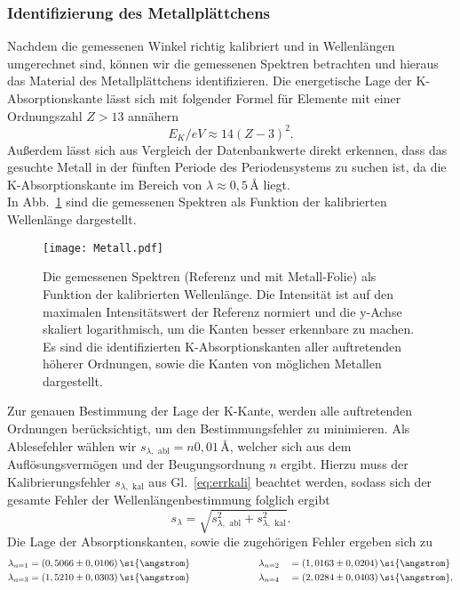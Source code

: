 \subsubsection{Identifizierung des Metallplättchens}
Nachdem die gemessenen Winkel richtig kalibriert und in Wellenlängen umgerechnet sind, können wir die 
gemessenen Spektren betrachten und hieraus das Material des Metallplättchens identifizieren. 
Die energetische Lage der K-Absorptionskante lässt sich mit folgender Formel für Elemente mit 
einer Ordnungszahl $Z>13$ annähern \cite{Kener}
\begin{equation}
    E_{K}/\si{eV} \approx 14\left(Z-3\right)^{2}.
\end{equation}
Außerdem lässt sich aus Vergleich der Datenbankwerte \cite{Database} direkt erkennen, dass 
das gesuchte Metall in der fünften Periode des Periodensystems zu suchen ist, da die K-Absorptionskante 
im Bereich von $\lambda\approx 0,5\,\si{\angstrom}$ liegt. \\
In Abb.~\ref{fig:metallspekt} sind die gemessenen Spektren als Funktion der kalibrierten 
Wellenlänge dargestellt.
\begin{figure}[h!]
    \centering
    \texttt{[image: Metall.pdf]}
    \caption{\label{fig:metallspekt}Die gemessenen Spektren (Referenz und mit Metall-Folie)
    als Funktion der kalibrierten Wellenlänge. Die Intensität ist auf den maximalen Intensitätswert der 
    Referenz normiert und die y-Achse skaliert logarithmisch, um die Kanten besser erkennbare zu machen.
    Es sind die identifizierten K-Absorptionskanten aller auftretenden höherer Ordnungen, sowie die 
    Kanten von möglichen Metallen dargestellt.}
\end{figure}\FloatBarrier
Zur genauen Bestimmung der Lage der K-Kante, werden alle auftretenden 
Ordnungen berücksichtigt, um den Bestimmungsfehler zu minimieren.
Als Ablesefehler wählen wir $s_{\lambda,\text{ abl}} = n0,01\,\si{\angstrom}$, welcher sich aus
dem Auflösungsvermögen und der Beugungsordnung $n$ ergibt. Hierzu muss der Kalibrierungsfehler $s_{\lambda,\text{ kal}}$ 
aus Gl.~\eqref{eq:errkali} beachtet werden, sodass sich der gesamte Fehler der Wellenlängenbestimmung 
folglich ergibt
\begin{equation}\label{eq:fehler}
    s_{\lambda} = \sqrt{s_{\lambda,\text{ abl}}^{2} + s_{\lambda,\text{ kal}}^{2}}.
\end{equation} 
Die Lage der Absorptionskanten, sowie die zugehörigen Fehler ergeben sich zu
\begin{alignat}{2}  
    \lambda_{n=1} &= (0,5066\pm0,0106)\,\si{\angstrom}\hspace{2.5cm}\lambda_{n=2} &&= (1,0163\pm0,0204)\,\si{\angstrom} \\
    \lambda_{n=3} &= (1,5210\pm0,0303)\,\si{\angstrom}\hspace{2.5cm}\lambda_{n=4} &&= (2,0284\pm0,0403)\,\si{\angstrom},
\end{alignat}
